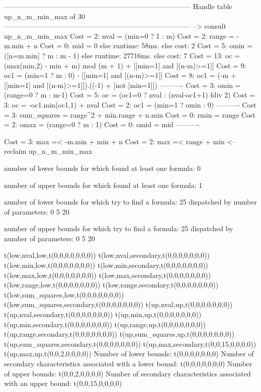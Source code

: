 --------------------------------------------------------------------------------
Handle table up_n_m_min_max of 30
--------------------------------------------------------------------------------
--> consult up_n_m_min_max
Cost =  2:  nval        = (min=0 ? 1 : m)
Cost =  2:  range       = -m.min + n
Cost =  0:  mid         = 0
else runtime: 58ms. else cost: 2
Cost =  5:  omin        = ([n=m.min] ? m : m - 1) %
else runtime: 27716ms. else cost: 7
Cost = 13:  oc          = (max(min,2) - min + m) mod (m + 1) + [[min=1] and [(n-m)>=1]] %
Cost =  9:  oc1         = (min=1 ? m : 0) - [[min=1] and [(n-m)>=1]] %
Cost =  8:  oc1         = (-m + [[min=1] and [(n-m)>=1]]).((-1) + [not [min=1]]) %
----------
Cost =  3:  omin        = (range=0 ? m : m-1)
Cost =  5:  oc          = (oc1=0 ? nval : (nval-oc1+1) fdiv 2)
Cost =  3:  oc          = -oc1.min(oc1,1) + nval
Cost =  2:  oc1         = (min=1 ? omin : 0)
----------
Cost =  3:  sum_squares = range^2 + min.range + n.min
Cost =  0:  rmin        = range
Cost =  2:  omax        = (range=0 ? m : 1)
Cost =  0:  omid        = mid
----------

Cost =  3:  max =< -m.min + min + n
Cost =  2:  max =< range + min
<-- reclaim up_n_m_min_max

number of lower bounds for which found at least one formula: 0

number of upper bounds for which found at least one formula: 1

number of lower bounds for which try to find a formula: 25
dispatched by number of parameters: 0  5  20

number of upper bounds for which try to find a formula: 25
dispatched by number of parameters: 0  5  20

t(low,nval,low,t(0,0,0,0,0,0,0))
t(low,nval,secondary,t(0,0,0,0,0,0,0))
t(low,min,low,t(0,0,0,0,0,0,0))
t(low,min,secondary,t(0,0,0,0,0,0,0))
t(low,max,low,t(0,0,0,0,0,0,0))
t(low,max,secondary,t(0,0,0,0,0,0,0))
t(low,range,low,t(0,0,0,0,0,0,0))
t(low,range,secondary,t(0,0,0,0,0,0,0))
t(low,sum_squares,low,t(0,0,0,0,0,0,0))
t(low,sum_squares,secondary,t(0,0,0,0,0,0,0))
t(up,nval,up,t(0,0,0,0,0,0,0))
t(up,nval,secondary,t(0,0,0,0,0,0,0))
t(up,min,up,t(0,0,0,0,0,0,0))
t(up,min,secondary,t(0,0,0,0,0,0,0))
t(up,range,up,t(0,0,0,0,0,0,0))
t(up,range,secondary,t(0,0,0,0,0,0,0))
t(up,sum_squares,up,t(0,0,0,0,0,0,0))
t(up,sum_squares,secondary,t(0,0,0,0,0,0,0))
t(up,max,secondary,t(0,0,15,0,0,0,0))
t(up,max,up,t(0,0,2,0,0,0,0))
Number of lower bounds:                                             t(0,0,0,0,0,0,0)
Number of secondary characteristics associated with a lower bound:  t(0,0,0,0,0,0,0)
Number of upper bounds:                                             t(0,0,2,0,0,0,0)
Number of secondary characteristics associated with an upper bound: t(0,0,15,0,0,0,0)

